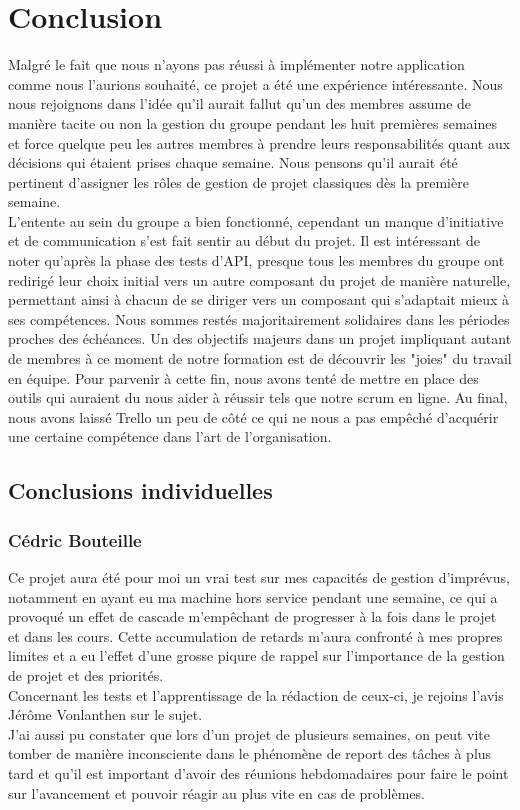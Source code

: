 \documentclass[a4paper, 12pt]{article}
\begin{document}
\section{Conclusion}
Malgré le fait que nous n'ayons pas réussi à implémenter notre application comme nous l'aurions souhaité, ce projet a été une expérience intéressante. Nous nous rejoignons dans l'idée qu'il aurait fallut qu'un des membres assume de manière tacite ou non la gestion du groupe pendant les huit premières semaines et force quelque peu les autres membres à prendre leurs responsabilités quant aux décisions qui étaient prises chaque semaine. Nous pensons qu'il aurait été pertinent d'assigner les rôles de gestion de projet classiques dès la première semaine.\\
L'entente au sein du groupe a bien fonctionné, cependant un manque d'initiative et de communication s'est fait sentir au début du projet. Il est intéressant de noter qu'après la phase des tests d'API, presque tous les membres du groupe ont redirigé leur choix initial vers un autre composant du projet de manière naturelle, permettant ainsi à chacun de se diriger vers un composant qui s'adaptait mieux à ses compétences. Nous sommes restés majoritairement solidaires dans les périodes proches des échéances. Un des objectifs majeurs dans un projet impliquant autant de membres à ce moment de notre formation est de découvrir les "joies" du travail en équipe. Pour parvenir à cette fin, nous avons tenté de mettre en place des outils qui auraient du nous aider à réussir tels que notre scrum en ligne. Au final, nous avons laissé Trello un peu de côté ce qui ne nous a pas empêché d'acquérir une certaine compétence dans l'art de l'organisation.

\subsection{Conclusions individuelles}
\subsubsection{Cédric Bouteille}
Ce projet aura été pour moi un vrai test sur mes capacités de gestion d'imprévus, notamment en ayant eu ma machine hors service pendant une semaine, ce qui a provoqué un effet de cascade m'empêchant de progresser à la fois dans le projet et dans les cours. Cette accumulation de retards m'aura confronté à mes propres limites et a eu l'effet d'une grosse piqure de rappel sur l'importance de la gestion de projet et des priorités.\\
Concernant les tests et l'apprentissage de la rédaction de ceux-ci, je rejoins l'avis Jérôme Vonlanthen sur le sujet.\\
J'ai aussi pu constater que lors d'un projet de plusieurs semaines, on peut vite tomber de manière inconsciente dans le phénomène de report des tâches à plus tard et qu'il est important d'avoir des réunions hebdomadaires pour faire le point sur l'avancement et pouvoir réagir au plus vite en cas de problèmes.
\end{document}
